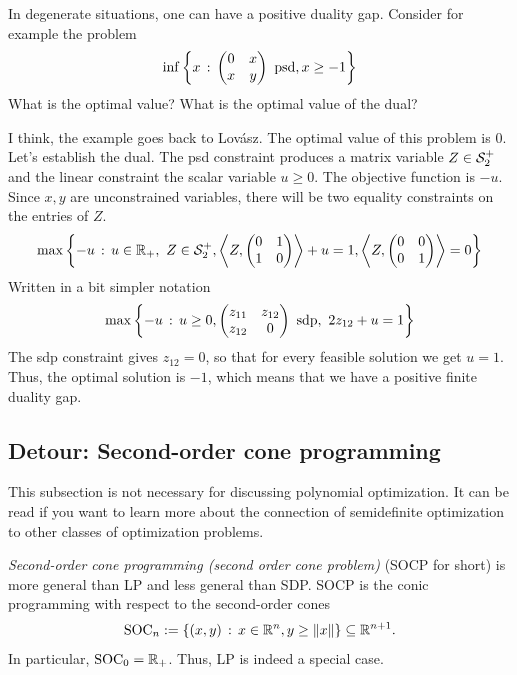 \begin{exercise}
	In degenerate situations, one can have a positive duality gap. Consider for example the problem
	\[
		\inf \setcond{x}{ \begin{pmatrix} 0 & x \\ x & y \end{pmatrix} \ \text{psd}, x  \ge -1 }
	\]
	What is the optimal value? What is the optimal value of the dual?
\end{exercise}
\begin{solution}
	I think, the example goes back to Lov\'asz. 
	The optimal value of this problem is $0$. 
Let's establish the dual. The psd constraint produces a matrix variable $Z \in \mathcal{S}_2^+$ and the linear constraint the scalar variable $u \ge 0$. The objective function is $-u$. Since $x, y$ are unconstrained variables, there will be two equality constraints on the entries of $Z$. 
\[
\max \left\{ -u \,:\, u \in \mathbb{R}_+, \ Z \in \mathcal{S}_2^+,  \left\langle Z , \begin{pmatrix} 0 & 1 \\ 1 & 0 \end{pmatrix}  \right\rangle + u =  1, \left\langle Z , \begin{pmatrix} 0 & 0 \\ 0 & 1 \end{pmatrix}  \right\rangle =  0 \right\}
\]
Written in a bit simpler notation 
\[
\max \left\{ -u \,:\, u \ge 0, \begin{pmatrix} z_{11} & z_{12} \\ z_{12} & 0 \end{pmatrix} \ \text{sdp}, \ 2 z_{12} + u = 1 \right\}
\]
The sdp constraint gives $z_{12} = 0$, so that for every feasible solution we get $u=1$. Thus, the optimal solution is $-1$, which means that we have a positive finite duality gap. 
\end{solution}


\subsection{Detour: Second-order cone programming}

\label{soc:programming}

This subsection is not necessary for discussing polynomial optimization. It can be read if you want to learn more about the connection of semidefinite optimization to other classes of optimization problems. 

	\emph{Second-order cone programming (second order cone problem)} (SOCP for short) is more general than LP and less general than SDP. SOCP is the conic programming with respect to the second-order cones 
	\[
		\operatorname{SOC}_{n}:=\left\{ (x,y) \,:\, x \in \mathbb{R}^n, y \ge \|x \| \right\} \subseteq \mathbb{R}^{n+1}.
	\]
	In particular, $\operatorname{SOC}_0=\mathbb{R}_+$. Thus, LP is indeed a special case.
	
